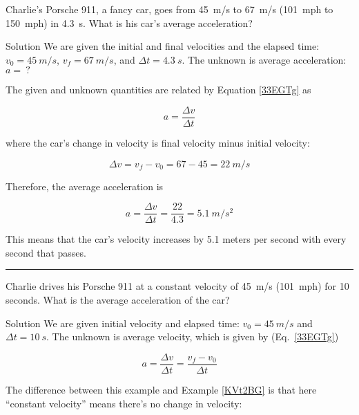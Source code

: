 \documentclass[dvipsnames]{article}
\begin{document}
\begin{example} \label{KVt2BG}
   Charlie's Porsche 911, a fancy car, goes from \SI{45}{m/s} to \SI{67}{m/s} (\SI{101}{mph} to \SI{150}{mph}) in \SI{4.3}{s}. What is his car's average acceleration? 
\end{example}

Solution We are given the initial and final velocities and the elapsed time: $v_0 = \SI{45}{m/s}$, $v_f = \SI{67}{m/s}$, and $\Delta{t} = \SI{4.3}{s}$. The unknown is average acceleration: $a =\ ?$

\vspace{1em}

The given and unknown quantities are related by Equation \eqref{33EGTg} as

\begin{equation*}
    a = \frac{\Delta{v}}{\Delta{t}}
\end{equation*}

where the car's change in velocity is final velocity minus initial velocity:

\begin{equation*}
    \Delta{v} = v_f - v_0 = 67 - 45 = \SI{22}{m/s}
\end{equation*}

Therefore, the average acceleration is

 \begin{equation*}
    a = \frac{\Delta{v}}{\Delta{t}} = \frac{22}{4.3} = \SI{5.1}{m/s^2}
\end{equation*}

This means that the car's velocity increases by 5.1 meters per second with every second that passes.

\hrule


\begin{example} \label{DcGEnk}
    Charlie drives his Porsche 911 at a constant velocity of \SI{45}{m/s} (\SI{101}{mph}) for 10 seconds. What is the average acceleration of the car?
\end{example}

Solution We are given initial velocity and elapsed time: $v_0 = \SI{45}{m/s}$ and $\Delta{t} = \SI{10}{s}$. The unknown is average velocity, which is given by (Eq.~\ref{33EGTg})

\begin{equation*}
    a = \frac{\Delta{v}}{\Delta{t}} = \frac{v_f - v_0}{\Delta{t}}
\end{equation*}

The difference between this example and Example \ref{KVt2BG} is that here ``constant velocity'' means there's no change in velocity: 
\end{document}
